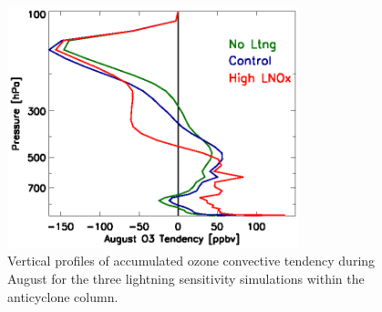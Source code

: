  \begin{figure}
 \noindent\includegraphics[width=20pc]{figures/ltngsens_o3conv.eps}
 \caption{Vertical profiles of accumulated ozone convective tendency
during August for the three lightning sensitivity simulations within the
anticyclone column.}
 \label{fig:ltng_conv}
 \end{figure}